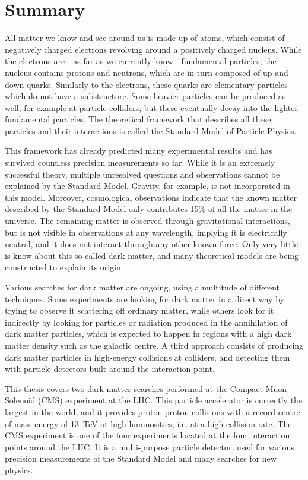 
\chapter*{Summary}

All matter we know and see around us is made up of atoms, which consist of negatively charged electrons revolving around a positively charged nucleus. While the electrons are - as far as we currently know - fundamental particles, the nucleus contains protons and neutrons, which are in turn composed of up and down quarks. Similarly to the electrons, these quarks are elementary particles which do not have a substructure. Some heavier particles can be produced as well, for example at particle colliders, but these eventually decay into the lighter fundamental particles. The theoretical framework that describes all these particles and their interactions is called the Standard Model of Particle Physics.

This framework has already predicted many experimental results and has survived countless precision measurements so far. While it is an extremely successful theory, multiple unresolved questions and observations cannot be explained by the Standard Model. Gravity, for example, is not incorporated in this model. Moreover, cosmological observations indicate that the known matter described by the Standard Model only contributes 15\% of all the matter in the universe. The remaining  matter is observed through gravitational interactions, but is not visible in observations at any wavelength, implying it is electrically neutral, and it does not interact through any other known force. Only very little is know about this so-called dark matter, and many theoretical models are being constructed to explain its origin. 

Various searches for dark matter are ongoing, using a multitude of different techniques. Some experiments are looking for dark matter in a direct way by trying to observe it scattering off ordinary matter, while others look for it indirectly by looking for particles or radiation produced in the annihilation of dark matter particles, which is expected to happen in regions with a high dark matter density such as the galactic centre. A third approach consists of producing dark matter particles in high-energy collisions at colliders, and detecting them with particle detectors built around the interaction point.

This thesis covers two dark matter searches performed at the Compact Muon Solenoid (CMS) experiment at the LHC. This particle accelerator is currently the largest in the world, and it provides proton-proton collisions with a record centre-of-mass energy of \SI{13}{TeV} at high luminosities, i.e. at a high collision rate. The CMS experiment is one of the four experiments located at the four interaction points around the LHC. It is a multi-purpose particle detector, used for various precision measurements of the Standard Model and many searches for new physics.

